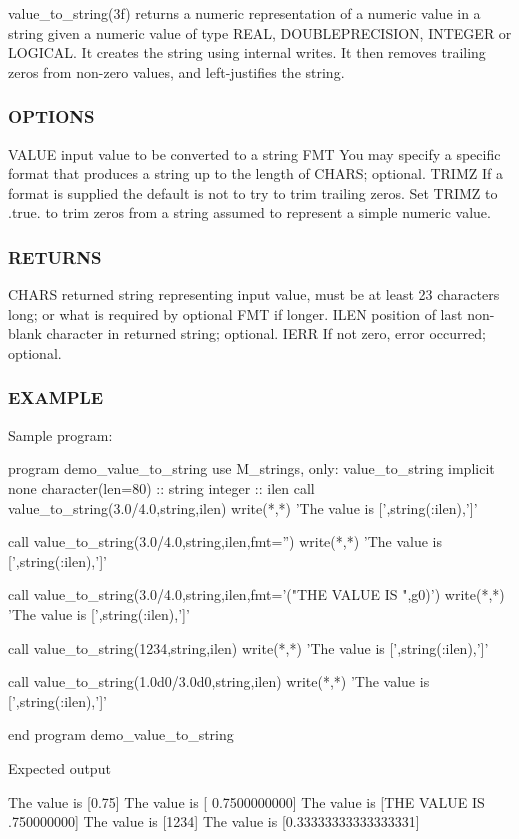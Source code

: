 value\+\_\+to\+\_\+string(3f) returns a numeric representation of a numeric value in a string given a numeric value of type R\+E\+AL, D\+O\+U\+B\+L\+E\+P\+R\+E\+C\+I\+S\+I\+ON, I\+N\+T\+E\+G\+ER or L\+O\+G\+I\+C\+AL. It creates the string using internal writes. It then removes trailing zeros from non-\/zero values, and left-\/justifies the string.

\subsubsection*{O\+P\+T\+I\+O\+NS}

V\+A\+L\+UE input value to be converted to a string F\+MT You may specify a specific format that produces a string up to the length of C\+H\+A\+RS; optional. T\+R\+I\+MZ If a format is supplied the default is not to try to trim trailing zeros. Set T\+R\+I\+MZ to .true. to trim zeros from a string assumed to represent a simple numeric value.

\subsubsection*{R\+E\+T\+U\+R\+NS}

C\+H\+A\+RS returned string representing input value, must be at least 23 characters long; or what is required by optional F\+MT if longer. I\+L\+EN position of last non-\/blank character in returned string; optional. I\+E\+RR If not zero, error occurred; optional. \subsubsection*{E\+X\+A\+M\+P\+LE}

\begin{DoxyVerb}Sample program:

  program demo_value_to_string
  use M_strings, only: value_to_string
  implicit none
  character(len=80) :: string
  integer           :: ilen
     call value_to_string(3.0/4.0,string,ilen)
     write(*,*) 'The value is [',string(:ilen),']'

     call value_to_string(3.0/4.0,string,ilen,fmt='')
     write(*,*) 'The value is [',string(:ilen),']'

     call value_to_string(3.0/4.0,string,ilen,fmt='("THE VALUE IS ",g0)')
     write(*,*) 'The value is [',string(:ilen),']'

     call value_to_string(1234,string,ilen)
     write(*,*) 'The value is [',string(:ilen),']'

     call value_to_string(1.0d0/3.0d0,string,ilen)
     write(*,*) 'The value is [',string(:ilen),']'

  end program demo_value_to_string

Expected output

 The value is [0.75]
 The value is [      0.7500000000]
 The value is [THE VALUE IS .750000000]
 The value is [1234]
 The value is [0.33333333333333331]
\end{DoxyVerb}



